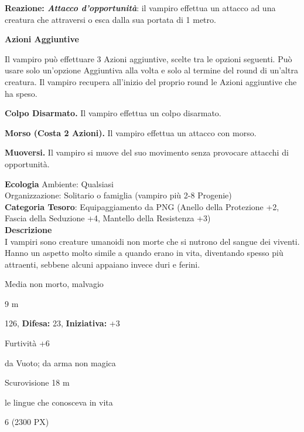 \begin{multicols}{2}
{\textbf{Reazione: \emph{Attacco d'opportunità}}: il vampiro effettua un attacco ad una creatura che attraversi o esca dalla sua portata di 1 metro.

\textbf{Azioni Aggiuntive}

Il vampiro può effettuare 3 Azioni aggiuntive, scelte tra le opzioni seguenti. Può usare solo un'opzione Aggiuntiva alla volta e solo al termine del round di un'altra creatura. Il vampiro recupera all'inizio del proprio round le Azioni aggiuntive che ha speso.

\textbf{Colpo Disarmato.} Il vampiro effettua un colpo disarmato.

\textbf{Morso (Costa 2 Azioni).} Il vampiro effettua un attacco con morso.

\textbf{Muoversi.} Il vampiro si muove del suo movimento senza provocare attacchi di opportunità.

\textbf{Ecologia}
Ambiente: Qualsiasi\\
Organizzazione: Solitario o famiglia (vampiro più 2-8 Progenie)\\
\textbf{Categoria Tesoro}: Equipaggiamento da PNG (Anello della Protezione +2, Fascia della Seduzione +4, Mantello della Resistenza +3)\\
\textbf{Descrizione}\\
I vampiri sono creature umanoidi non morte che si nutrono del sangue dei viventi. Hanno un aspetto molto simile a quando erano in vita, diventando spesso più attraenti, sebbene alcuni appaiano invece duri e ferini.

\noindent
\begin{description}[noitemsep, topsep=0pt, parsep=0pt, partopsep=0pt, leftmargin=0cm, labelwidth=2.2cm]
	\item[\textbf{Taglia/Tipo:}] Media non morto, malvagio
	\item[\textbf{Movimento:}] 9 m
	\item[\textbf{Tiri Salvez.:}] 
	\item[\textbf{Caratt.:}] 
	\item[\textbf{Punti Ferita:}] 126,  \textbf{Difesa:} 23,  \textbf{Iniziativa:} +3
	\item[\textbf{Comp.:}] Furtività +6
	\item[\textbf{Res. Danni:}] da Vuoto; da arma non magica
	\item[\textbf{Sensi:}] Scurovisione 18 m
	\item[\textbf{Linguaggi:}] le lingue che conosceva in vita
	\item[\textbf{Sfida:}] 6 (2300 PX)\smallskip
\end{description}

}
\end{multicols}
